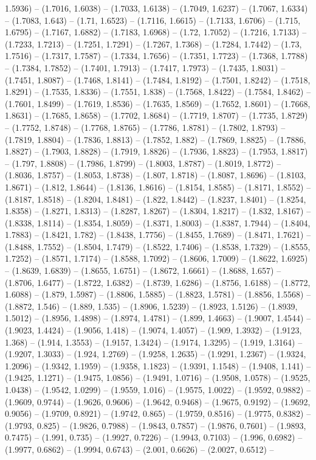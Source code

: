 1.5936) -- (1.7016, 1.6038) -- (1.7033, 1.6138) -- (1.7049, 1.6237) -- (1.7067, 1.6334) -- (1.7083, 1.643) -- (1.71, 1.6523) -- (1.7116, 1.6615) -- (1.7133, 1.6706) -- (1.715, 1.6795) -- (1.7167, 1.6882) -- (1.7183, 1.6968) -- (1.72, 1.7052) -- (1.7216, 1.7133) -- (1.7233, 1.7213) -- (1.7251, 1.7291) -- (1.7267, 1.7368) -- (1.7284, 1.7442) -- (1.73, 1.7516) -- (1.7317, 1.7587) -- (1.7334, 1.7656) -- (1.7351, 1.7723) -- (1.7368, 1.7788) -- (1.7384, 1.7852) -- (1.7401, 1.7913) -- (1.7417, 1.7973) -- (1.7435, 1.8031) -- (1.7451, 1.8087) -- (1.7468, 1.8141) -- (1.7484, 1.8192) -- (1.7501, 1.8242) -- (1.7518, 1.8291) -- (1.7535, 1.8336) -- (1.7551, 1.838) -- (1.7568, 1.8422) -- (1.7584, 1.8462) -- (1.7601, 1.8499) -- (1.7619, 1.8536) -- (1.7635, 1.8569) -- (1.7652, 1.8601) -- (1.7668, 1.8631) -- (1.7685, 1.8658) -- (1.7702, 1.8684) -- (1.7719, 1.8707) -- (1.7735, 1.8729) -- (1.7752, 1.8748) -- (1.7768, 1.8765) -- (1.7786, 1.8781) -- (1.7802, 1.8793) -- (1.7819, 1.8804) -- (1.7836, 1.8813) -- (1.7852, 1.882) -- (1.7869, 1.8825) -- (1.7886, 1.8827) -- (1.7903, 1.8828) -- (1.7919, 1.8826) -- (1.7936, 1.8823) -- (1.7953, 1.8817) -- (1.797, 1.8808) -- (1.7986, 1.8799) -- (1.8003, 1.8787) -- (1.8019, 1.8772) -- (1.8036, 1.8757) -- (1.8053, 1.8738) -- (1.807, 1.8718) -- (1.8087, 1.8696) -- (1.8103, 1.8671) -- (1.812, 1.8644) -- (1.8136, 1.8616) -- (1.8154, 1.8585) -- (1.8171, 1.8552) -- (1.8187, 1.8518) -- (1.8204, 1.8481) -- (1.822, 1.8442) -- (1.8237, 1.8401) -- (1.8254, 1.8358) -- (1.8271, 1.8313) -- (1.8287, 1.8267) -- (1.8304, 1.8217) -- (1.832, 1.8167) -- (1.8338, 1.8114) -- (1.8354, 1.8059) -- (1.8371, 1.8003) -- (1.8387, 1.7944) -- (1.8404, 1.7883) -- (1.8421, 1.782) -- (1.8438, 1.7756) -- (1.8455, 1.7689) -- (1.8471, 1.7621) -- (1.8488, 1.7552) -- (1.8504, 1.7479) -- (1.8522, 1.7406) -- (1.8538, 1.7329) -- (1.8555, 1.7252) -- (1.8571, 1.7174) -- (1.8588, 1.7092) -- (1.8606, 1.7009) -- (1.8622, 1.6925) -- (1.8639, 1.6839) -- (1.8655, 1.6751) -- (1.8672, 1.6661) -- (1.8688, 1.657) -- (1.8706, 1.6477) -- (1.8722, 1.6382) -- (1.8739, 1.6286) -- (1.8756, 1.6188) -- (1.8772, 1.6088) -- (1.879, 1.5987) -- (1.8806, 1.5885) -- (1.8823, 1.5781) -- (1.8856, 1.5568) -- (1.8872, 1.546) -- (1.889, 1.535) -- (1.8906, 1.5239) -- (1.8923, 1.5126) -- (1.8939, 1.5012) -- (1.8956, 1.4898) -- (1.8974, 1.4781) -- (1.899, 1.4663) -- (1.9007, 1.4544) -- (1.9023, 1.4424) -- (1.9056, 1.418) -- (1.9074, 1.4057) -- (1.909, 1.3932) -- (1.9123, 1.368) -- (1.914, 1.3553) -- (1.9157, 1.3424) -- (1.9174, 1.3295) -- (1.919, 1.3164) -- (1.9207, 1.3033) -- (1.924, 1.2769) -- (1.9258, 1.2635) -- (1.9291, 1.2367) -- (1.9324, 1.2096) -- (1.9342, 1.1959) -- (1.9358, 1.1823) -- (1.9391, 1.1548) -- (1.9408, 1.141) -- (1.9425, 1.1271) -- (1.9475, 1.0856) -- (1.9491, 1.0716) -- (1.9508, 1.0578) -- (1.9525, 1.0438) -- (1.9542, 1.0299) -- (1.9559, 1.016) -- (1.9575, 1.0022) -- (1.9592, 0.9882) -- (1.9609, 0.9744) -- (1.9626, 0.9606) -- (1.9642, 0.9468) -- (1.9675, 0.9192) -- (1.9692, 0.9056) -- (1.9709, 0.8921) -- (1.9742, 0.865) -- (1.9759, 0.8516) -- (1.9775, 0.8382) -- (1.9793, 0.825) -- (1.9826, 0.7988) -- (1.9843, 0.7857) -- (1.9876, 0.7601) -- (1.9893, 0.7475) -- (1.991, 0.735) -- (1.9927, 0.7226) -- (1.9943, 0.7103) -- (1.996, 0.6982) -- (1.9977, 0.6862) -- (1.9994, 0.6743) -- (2.001, 0.6626) -- (2.0027, 0.6512) -- 